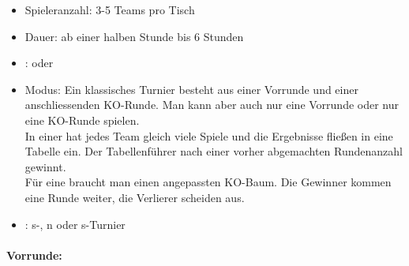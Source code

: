 \begin{itemize}
\item Spieleranzahl: 3-5 Teams pro Tisch
\item Dauer: ab einer halben Stunde bis 6 Stunden
\item {}:  oder  
\item Modus: Ein klassisches Turnier besteht aus einer Vorrunde und einer anschliessenden KO-Runde. Man kann aber auch nur eine Vorrunde oder nur eine KO-Runde spielen. \\
In einer  hat jedes Team gleich viele Spiele und die Ergebnisse fließen in eine Tabelle ein. 
Der Tabellenführer nach einer vorher abgemachten Rundenanzahl gewinnt. \\
Für eine  braucht man einen angepassten KO-Baum. Die Gewinner kommen eine Runde weiter, die Verlierer scheiden aus. 
\item {}:
s-, n oder s-Turnier
\end{itemize}

\paragraph{Vorrunde:}
\label{turniere:vorbereitung:spielrunden:vorrunde}

